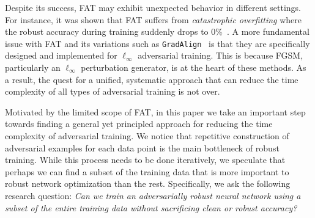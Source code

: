 \documentclass[runningheads]{llncs}
\begin{document}
Despite its success, FAT may exhibit unexpected behavior in different settings.
For instance, it was shown that FAT suffers from \textit{catastrophic overfitting} where the robust accuracy during training suddenly drops to 0\%~\cite{wong2020fast,andriushchenko2020understanding}.
A more fundamental issue with FAT and its variations such as \texttt{GradAlign}~\cite{andriushchenko2020understanding} is that they are specifically designed and implemented for $\ell_\infty$ adversarial training.
This is because FGSM, particularly an $\ell_\infty$ perturbation generator, is at the heart of these methods.
As a result, the quest for a unified, systematic approach that can reduce the time complexity of all types of adversarial training is not over.

Motivated by the limited scope of FAT, in this paper we take an important step towards finding a general yet principled approach for reducing the time complexity of adversarial training.
We notice that repetitive construction of adversarial examples for each data point is the main bottleneck of robust training.
While this process needs to be done iteratively, we speculate that perhaps we can find a subset of the training data that is more important to robust network optimization than the rest.
Specifically, we ask the following research question: \textit{Can we train an adversarially robust neural network using a subset of the entire training data without sacrificing clean or robust accuracy?}
\end{document}
